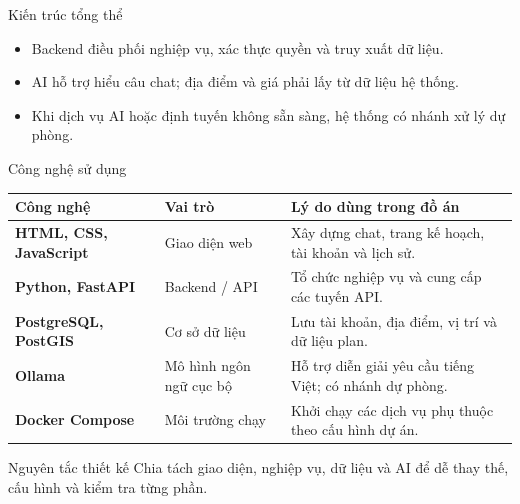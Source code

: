 \documentclass[aspectratio=169,11pt]{beamer}
\begin{document}
\begin{frame}{Kiến trúc tổng thể}
  \centering
  \vspace{0.3cm}
  \begin{itemize}
    \item Backend điều phối nghiệp vụ, xác thực quyền và truy xuất dữ liệu.
    \item AI hỗ trợ hiểu câu chat; địa điểm và giá phải lấy từ dữ liệu hệ thống.
    \item Khi dịch vụ AI hoặc định tuyến không sẵn sàng, hệ thống có nhánh xử lý dự phòng.
  \end{itemize}
\end{frame}

\begin{frame}{Công nghệ sử dụng}
  \small
  \begin{tabularx}{\textwidth}{>{\bfseries}p{3.2cm}p{3cm}X}
    \toprule
    Công nghệ & Vai trò & Lý do dùng trong đồ án\\
    \midrule
    HTML, CSS, JavaScript & Giao diện web & Xây dựng chat, trang kế hoạch, tài khoản và lịch sử.\\
    Python, FastAPI & Backend / API & Tổ chức nghiệp vụ và cung cấp các tuyến API.\\
    PostgreSQL, PostGIS & Cơ sở dữ liệu & Lưu tài khoản, địa điểm, vị trí và dữ liệu plan.\\
    Ollama & Mô hình ngôn ngữ cục bộ & Hỗ trợ diễn giải yêu cầu tiếng Việt; có nhánh dự phòng.\\
    Docker Compose & Môi trường chạy & Khởi chạy các dịch vụ phụ thuộc theo cấu hình dự án.\\
    \bottomrule
  \end{tabularx}
  \vspace{0.35cm}
  \begin{alertblock}{Nguyên tắc thiết kế}
    Chia tách giao diện, nghiệp vụ, dữ liệu và AI để dễ thay thế, cấu hình và kiểm tra từng phần.
  \end{alertblock}
\end{frame}
\end{document}
